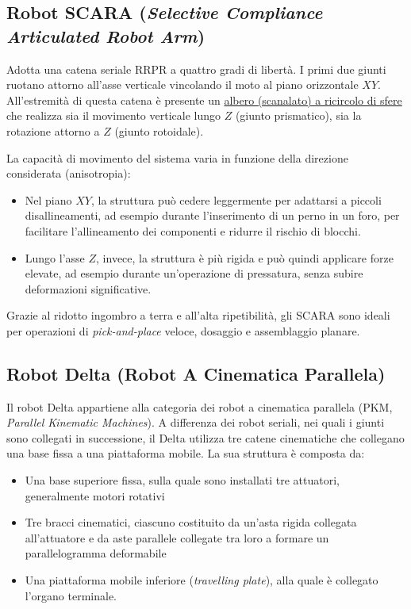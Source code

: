 ﻿\documentclass[11pt, a4paper]{article}
\begin{document}
\subsection{Robot SCARA (\textit{Selective Compliance Articulated Robot Arm})}
Adotta una catena seriale $\text{RRPR}$ a quattro gradi di libertà. I primi due giunti ruotano attorno all'asse verticale vincolando il moto al piano orizzontale $XY$. All'estremità di questa catena è presente un \underline{albero (scanalato) a ricircolo di sfere} che realizza sia il movimento verticale lungo $Z$ (giunto prismatico), sia la rotazione attorno a $Z$ (giunto rotoidale).

La capacità di movimento del sistema varia in funzione della direzione considerata (anisotropia):
\begin{itemize}
    \item Nel piano $XY$, la struttura può cedere leggermente per adattarsi a piccoli disallineamenti, ad esempio durante l'inserimento di un perno in un foro, per facilitare l'allineamento dei componenti e ridurre il rischio di blocchi.

    \item Lungo l'asse $Z$, invece, la struttura è più rigida e può quindi applicare forze elevate, ad esempio durante un'operazione di pressatura, senza subire deformazioni significative.
\end{itemize}
Grazie al ridotto ingombro a terra e all'alta ripetibilità, gli SCARA sono ideali per operazioni di \textit{pick-and-place} veloce, dosaggio e assemblaggio planare.
\newpage

\subsection{Robot Delta (Robot A Cinematica Parallela)}

Il robot Delta appartiene alla categoria dei robot a cinematica parallela (PKM, \textit{Parallel Kinematic Machines}). A differenza dei robot seriali, nei quali i giunti sono collegati in successione, il Delta utilizza tre catene cinematiche che collegano una base fissa a una piattaforma mobile. La sua struttura è composta da:
\begin{itemize}
    \item Una base superiore fissa, sulla quale sono installati tre attuatori, generalmente motori rotativi
    \item Tre bracci cinematici, ciascuno costituito da un'asta rigida collegata all'attuatore e da aste parallele collegate tra loro a formare un parallelogramma deformabile
    \item Una piattaforma mobile inferiore (\textit{travelling plate}), alla quale è collegato l'organo terminale.
\end{itemize}
\end{document}
